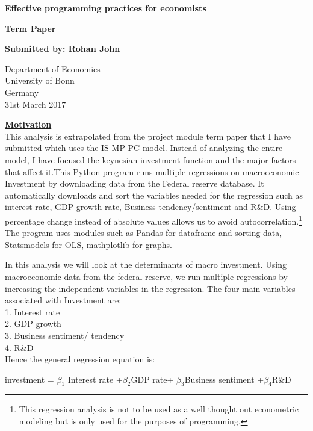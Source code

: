 \documentclass[12pt,a4paper,leqno]{report}
\theoremstyle{definition}
\begin{document}
	
\begin{titlepage}
	\begin{center}
		\vspace*{1cm}
		
		\textbf{Effective programming practices for economists}
		
		\vspace{0.5cm}
		\textbf{Term Paper} 
		
		\vspace{1cm}
		
		\textbf{Submitted by: Rohan John}
		
	   \vspace{0.5cm}
				
		Department of Economics\\
		University of Bonn\\
		Germany\\
		31st March 2017
		
		\vspace{1.5cm}
		\textbf{\underline{Motivation}} \\
		\vspace{1cm}
		This analysis is extrapolated from the project module term paper that I have submitted which uses the IS-MP-PC model. Instead of analyzing the entire model, I have focused the keynesian investment function and the major factors that affect it.This Python program runs multiple regressions on macroeconomic Investment by downloading data from the Federal reserve database. It automatically downloads and sort the variables needed for the regression such as interest rate, GDP growth rate, Business tendency/sentiment and R\&D. Using percentage change instead of absolute values allows us to avoid autocorrelation.\footnote{This regression analysis is not to be used as a well thought out econometric modeling but is only used for the purposes of programming.} The program uses modules such as Pandas for dataframe and sorting data, Statsmodels for OLS, mathplotlib for graphs.
		
	\end{center}
\end{titlepage}

In this analysis we will look at the determinants of macro investment. Using macroeconomic data from the federal reserve, we run multiple regressions by increasing the independent variables in the regression. The four main variables associated with Investment are:\\
1. Interest rate\\
2. GDP growth\\
3. Business sentiment/ tendency\\
4. R\&D\\
Hence the general regression equation is: 
\begin{center}
	investment = $\beta_{1}$ Interest rate +$\beta_{2}$GDP rate+ $\beta_{3}$Business sentiment +$\beta_{4}$R\&D
\end{center}
\end{document}
